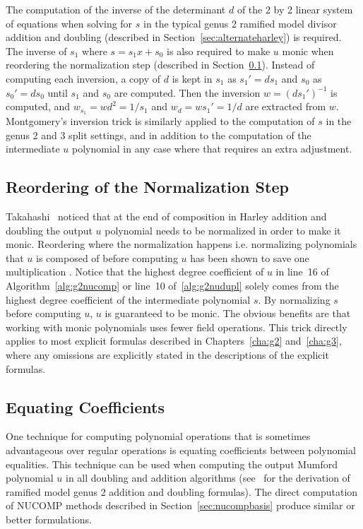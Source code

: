 The computation of the inverse of the determinant $d$ of the 2 by 2 linear
system of equations when solving for $s$ in the typical genus 2 ramified model
divisor addition and doubling (described in Section~\ref{sec:alternateharley})
is required. The inverse of $s_1$ where $s = s_1x + s_0$ is also required to
make $u$ monic when reordering the normalization step (described in
Section~\ref{sec:reordering}). Instead of computing each inversion, a copy of
$d$ is kept in $s_1$ as $s_1' = ds_1$ and $s_0$ as $s_0' = ds_0$ until $s_1$ and
$s_0$ are computed. Then the inversion $w = (ds_1')^{-1}$ is computed, and
$w_{s_1} = wd^2 = 1/s_1$ and $w_d = ws_1' = 1/d$ are extracted from $w$.
Montgomery's inversion trick is similarly applied to the computation of $s$ in
the genus 2 and 3 split settings, and in addition to the computation of the
intermediate $u$ polynomial in any case where that requires an extra adjustment.


\subsection{Reordering of the Normalization Step}
\label{sec:reordering}
Takahashi~\cite{Takahashi_inversiontrick_2002} noticed that at the end of
composition in Harley addition and doubling the output $u$ polynomial needs to
be normalized in order to make it monic. Reordering where the normalization
happens i.e. normalizing polynomials that $u$ is composed of before computing
$u$ has been shown to save one multiplication
\cite{Takahashi_inversiontrick_2002}. Notice that the highest degree coefficient
of $u$ in line~16 of Algorithm~\ref{alg:g2nucomp} or line~10
of~\ref{alg:g2nudupl} solely comes from the highest degree coefficient of the
intermediate polynomial $s$. By normalizing $s$ before computing $u$, $u$ is
guaranteed to be monic. The obvious benefits are that working with monic
polynomials uses fewer field operations. This trick directly applies to most
explicit formulas described in Chapters~\ref{cha:g2} and~\ref{cha:g3}, where any
omissions are explicitly stated in the descriptions of the explicit formulas. 

\subsection{Equating Coefficients} \label{sec:equatingcoeff} One technique for
computing polynomial operations that is sometimes advantageous over regular
operations is equating coefficients between polynomial equalities. This
technique can be used when computing the output Mumford polynomial $u$ in all
doubling and addition algorithms (see~\cite{CostelloLauter_geo_2011} for the
derivation of ramified model genus 2 addition and doubling formulas). The direct
computation of NUCOMP methods described in Section~\ref{sec:nucompbasis} produce
similar or better formulations.

